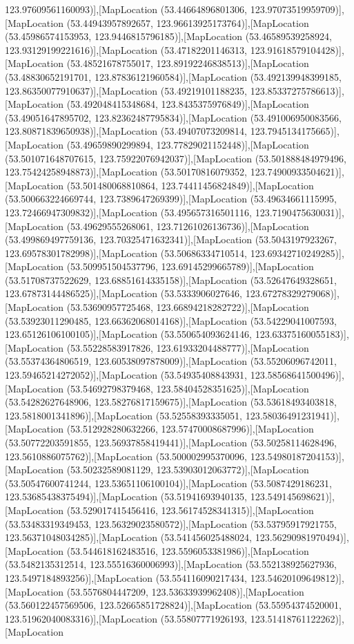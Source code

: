 123.97609561160093)],[MapLocation (53.44664896801306, 123.97073519959709)],[MapLocation (53.44943957892657, 123.96613925173764)],[MapLocation (53.45986574153953, 123.9446815796185)],[MapLocation (53.46589539258924, 123.93129199221616)],[MapLocation (53.47182201146313, 123.91618579104428)],[MapLocation (53.48521678755017, 123.89192246838513)],[MapLocation (53.48830652191701, 123.87836121960584)],[MapLocation (53.492139948399185, 123.86350077910637)],[MapLocation (53.49219101188235, 123.85337275786613)],[MapLocation (53.492048415348684, 123.8435375976849)],[MapLocation (53.49051647895702, 123.82362487795834)],[MapLocation (53.491006950083566, 123.80871839650938)],[MapLocation (53.49407073209814, 123.7945134175665)],[MapLocation (53.49659890299894, 123.77829021152448)],[MapLocation (53.501071648707615, 123.75922076942037)],[MapLocation (53.501888484979496, 123.75424258948873)],[MapLocation (53.50170816079352, 123.74900933504621)],[MapLocation (53.501480068810864, 123.74411456824849)],[MapLocation (53.500663224669744, 123.7389647269399)],[MapLocation (53.49634661115995, 123.72466947309832)],[MapLocation (53.495657316501116, 123.7190475630031)],[MapLocation (53.49629555268061, 123.71261026136736)],[MapLocation (53.499869497759136, 123.70325471632341)],[MapLocation (53.5043197923267, 123.69578301782998)],[MapLocation (53.50686334710514, 123.69342710249285)],[MapLocation (53.509951504537796, 123.69145299665789)],[MapLocation (53.51708737522629, 123.68851614335158)],[MapLocation (53.52647649328651, 123.67873144486525)],[MapLocation (53.5333906027646, 123.67278329279068)],[MapLocation (53.53690957725468, 123.66894218282722)],[MapLocation (53.53923011290485, 123.66362068014168)],[MapLocation (53.54229041007593, 123.65126106100105)],[MapLocation (53.550654093624146, 123.63375160055183)],[MapLocation (53.55228583917826, 123.61933204488777)],[MapLocation (53.55374364806519, 123.60538097878009)],[MapLocation (53.55206096742011, 123.59465214272052)],[MapLocation (53.54935408843931, 123.58568641500496)],[MapLocation (53.54692798379468, 123.58404528351625)],[MapLocation (53.54282627648906, 123.58276817159675)],[MapLocation (53.53618493403818, 123.5818001341896)],[MapLocation (53.52558393335051, 123.58036491231941)],[MapLocation (53.512928280632266, 123.57470008687996)],[MapLocation (53.50772203591855, 123.56937858419441)],[MapLocation (53.50258114628496, 123.5610886075762)],[MapLocation (53.500002995370096, 123.54980187204153)],[MapLocation (53.50232589081129, 123.53903012063772)],[MapLocation (53.50547600741244, 123.53651106100104)],[MapLocation (53.5087429186231, 123.53685438375494)],[MapLocation (53.51941693940135, 123.549145698621)],[MapLocation (53.529017415456416, 123.56174528341315)],[MapLocation (53.53483319349453, 123.56329023580572)],[MapLocation (53.53795917921755, 123.56371048034285)],[MapLocation (53.541456025488024, 123.56290981970494)],[MapLocation (53.544618162483516, 123.5596053381986)],[MapLocation (53.5482135312514, 123.55516360006993)],[MapLocation (53.552138925627936, 123.5497184893256)],[MapLocation (53.554116090217434, 123.54620109649812)],[MapLocation (53.5576804447209, 123.53633939962408)],[MapLocation (53.560122457569506, 123.52665851728824)],[MapLocation (53.55954374520001, 123.51962040083316)],[MapLocation (53.55807771926193, 123.51418761122262)],[MapLocation 